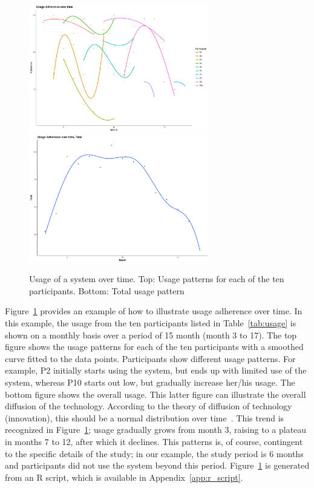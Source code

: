 \begin{figure}[!ht]
    \centering
    \includegraphics[width=0.7\textwidth]{./images/adherence_R_plot.pdf}
    \includegraphics[width=0.7\textwidth]{./images/adherence_total_R_plot.pdf}
    \caption{Usage of a system over time. Top: Usage patterns for each of the ten participants. Bottom: Total usage pattern}
    \label{fig:usage}
\end{figure}


Figure~\ref{fig:usage} provides an example of how to illustrate usage adherence over time. In this example, the usage from the ten participants listed in Table~\ref{tab:usage} is shown on a monthly basis over a period of 15 month (month 3 to 17).
%
The top figure shows the usage patterns for each of the ten participants with a smoothed curve fitted to the data points.
Participants show different usage patterns. For example, P2 initially starts using the system, but ends up with limited use of the system, whereas P10 starts out low, but gradually increase her/his usage.
The bottom figure shows the overall usage. This latter figure can illustrate the overall diffusion of the technology. According to the theory of diffusion of technology (innovation), this should be a normal distribution over time~\cite{rogers2003diffusion}. This trend is recognized in Figure~\ref{fig:usage}; usage gradually grows from month 3, raising to a plateau in months 7 to 12, after which it declines. This patterns is, of course, contingent to the specific details of the study; in our example, the study period is 6 months and participants did not use the system beyond this period.
%
Figure~\ref{fig:usage} is generated from an R script, which is available in Appendix~\ref{app:r_script}.



